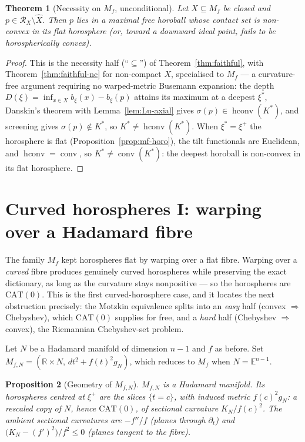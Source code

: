 \documentclass[11pt]{article}
\newtheorem{theorem}{Theorem}[section]
\newtheorem{proposition}[theorem]{Proposition}
\theoremstyle{remark}
\newcommand{\R}{\mathbb{R}}
\newcommand{\X}{X}
\newcommand{\Xhat}{\widehat{\X}}
\newcommand{\Rx}{\mathcal{R}_{\X}}
\newcommand{\conv}{\operatorname{conv}}
\newcommand{\hconv}{\operatorname{hconv}}
\newcommand{\Mf}{M_{f}}
\newcommand{\E}{\mathbb{E}}
\begin{document}
\begin{theorem}[Necessity on $\Mf$, unconditional]\label{thm:mf-nec}
Let $\X\subseteq\Mf$ be closed and $p\in\Rx\setminus\Xhat$. Then $p$
lies in a maximal free horoball whose contact set is non-convex in its
flat horosphere (or, toward a downward ideal point, fails to be
horospherically convex).
\end{theorem}

\begin{proof}
This is the necessity half (``$\subseteq$'') of
Theorem~\ref{thm:faithful}, with Theorem~\ref{thm:faithful-nc} for
non-compact $\X$, specialised to $\Mf$ --- a curvature-free argument
requiring no warped-metric Busemann expansion: the depth
$D(\xi)=\inf_{x\in\X}b_{\xi}(x)-b_{\xi}(p)$ attains its maximum at a
deepest $\xi^{\ast}$, Danskin's theorem with Lemma~\ref{lem:Lu-axial}
gives $\sigma(p)\in\hconv(K^{\ast})$, and screening gives
$\sigma(p)\notin K^{\ast}$, so $K^{\ast}\neq\hconv(K^{\ast})$. When
$\xi^{\ast}=\xi^{+}$ the horosphere is flat
(Proposition~\ref{prop:mf-horo}), the tilt functionals are Euclidean,
and $\hconv=\conv$, so $K^{\ast}\neq\conv(K^{\ast})$: the deepest
horoball is non-convex in its flat horosphere.
\end{proof}

\section{Curved horospheres I: warping over a Hadamard fibre}
\label{sec:curved}

The family $\Mf$ kept horospheres flat by warping over a flat fibre.
Warping over a \emph{curved} fibre produces genuinely curved
horospheres while preserving the exact dictionary, as long as the
curvature stays nonpositive --- so the horospheres are
$\mathrm{CAT}(0)$. This is the first curved-horosphere case, and it
locates the next obstruction precisely: the Motzkin equivalence splits
into an \emph{easy} half (convex $\Rightarrow$ Chebyshev), which
$\mathrm{CAT}(0)$ supplies for free, and a \emph{hard} half (Chebyshev
$\Rightarrow$ convex), the Riemannian Chebyshev-set problem.

Let $N$ be a Hadamard manifold of dimension $n-1$ and $f$ as before.
Set $M_{f,N}=(\R\times N,\,dt^{2}+f(t)^{2}g_{N})$, which reduces to
$\Mf$ when $N=\E^{n-1}$.

\begin{proposition}[Geometry of $M_{f,N}$]\label{prop:fN}
$M_{f,N}$ is a Hadamard manifold. Its horospheres centred at $\xi^{+}$
are the slices $\{t=c\}$, with induced metric $f(c)^{2}g_{N}$: a
rescaled copy of $N$, hence $\mathrm{CAT}(0)$, of sectional curvature
$K_{N}/f(c)^{2}$. The ambient sectional curvatures are $-f''/f$ (planes
through $\partial_{t}$) and $\bigl(K_{N}-(f')^{2}\bigr)/f^{2}\le0$
(planes tangent to the fibre).
\end{proposition}
\end{document}
